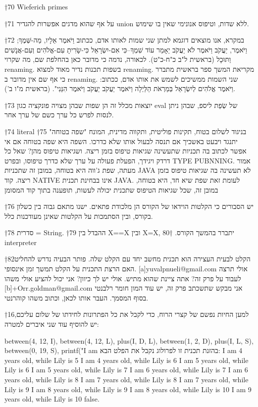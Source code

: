 †{70} Wieferich primes

†{71} על אף שהוא מדגים אפשרות להגדיר union ללא שדות, וטיפוס אנונימי שאין בו שימוש.

†{72} במקרא, אנו מוצאים דוגמא למתן שני שמות לאותו אדם, ככתוב וַיֹּאמֶר אֵלָיו, מַה-שְּׁמֶךָ; וַיֹּאמֶר, יַעֲקֹב וַיֹּאמֶר לֹא יַעֲקֹב יֵאָמֵר עוֹד שִׁמְךָ--כִּי אִם-יִשְׂרָאֵל כִּי-שָׂרִיתָ עִם-אֱלֹהִים וְעִם-אֲנָשִׁים וַתּוּכָל (בראשית ל"ב כ"ח-כ"ט). לכאורה, נדמה כי מדובר כאן בהחלפת שם, מה שקרוי renaming. בשפות תכנות נדיר מאוד למצוא renaming. מקריאת המשך ספר בראשית מתברר כי אף שם אין מדובר ב renaming. שני השמות ממשיכים לשמש את אותו אדם, ככתוב: וַיֹּאמֶר אֱלֹהִים לְיִשְׂרָאֵל בְּמַרְאֹת הַלַּיְלָה וַיֹּאמֶר יַעֲקֹב יַעֲקֹב וַיֹּאמֶר הִנֵּנִי". (בראשית מ"ו ב').

†{73} יוצאות מכלל זה הן שפות שבהן מצויה פונקציה כגון eval של שְׂפַת ליספ, שבהן ניתן לנסות לפרש כל ערך כשם של ערך אחר.

†{74} literal
†{75} בניגוד לשלום בטוח, תקינות פוליטית, ותקווה מדינית, המונח "שפה בטוחה" יתנגד ויבעט באשכיך אם תנסה לבעול אותו שלא כדרכו. השפה היא שפה בטוחה אם אי אפשר לכתוב בה תכניות שתעשינה שגיאות טיפוס בזמן ריצה. ושגיאות טיפוס מהן? שאל כל דרדק ויגידך, הפעלת פעולה על ערך שלא כדרך טיפוסו, ובפרט TYPE PUBNNING. אמור מעתה, שפת ג'ווה היא בטוחה, במובן זה שתכניות JAVA לא תעשינה בה שגיאות טיפוס בזמן ריצה. קוד NATIVE אינו בבחינת תכנית JAVA. לעומת זאת שפת שיא חד, היא בטוחה, במובן זה, שכל שגיאות הטיפוס שתכנית יכולה לעשות, תופענה בתוך קוד המסומן

†{76} יש הסבורים כי הקלטות הוידאו של הקורס הן מלכודת פתאים. ישנו מתאם גבוה בין כשלון בקורס, ובין הסתמכות על הקלטות שאינן מעודכנות כלל.

†{78} סדרית = String.
†{79} ההבדל בין X==X ובין X=X, יתברר בהמשך הקורס.
†{80} interpreter

†{82}הקלט לבעית העצירה הוא תכנית מחשב יחד עם הקלט שלה. פותר הבעיה נדרש להחליט האם הרצת התכנית על הקלט תמשך זמן אינסופי. [a]yuvalpnueli@gmail.com אולי תרצה לעבוד על פרק זה? אתה ציינת שהוא מתיש. אולי יש לך כיוון? אני יכול להציע אולי משהו [b]+Orr.goldman@gmail.com אני מבקש שתשכתב פרק זה, יש עוד המון חומר רלבנטי בסוף המסמך. העבר אותו לכאן, וכתוב משהו קוהרנטי.

†{16}למען החיות נפשם של קצרי הרוח, כדי לקבל את כל הפתרונות לחידתו של שלום עליכם, יש להוסיף עוד שני איברים למטרה:

        between(4, 12, I), between(4, 12, L),
        plus(I, D, L), between(1, 2, D), plus(I, L, S), between(0, 19, S),
        printf("I am %
        בהזנת תכנית זו לפרולוג נקבל את הפלט הבא:
        I am 4 years old, while Lily is 5
        I am 4 years old, while Lily is 6
        I am 5 years old, while Lily is 6
        I am 5 years old, while Lily is 7
        I am 6 years old, while Lily is 7
        I am 6 years old, while Lily is 8
        I am 7 years old, while Lily is 8
        I am 7 years old, while Lily is 9
        I am 8 years old, while Lily is 9
        I am 8 years old, while Lily is 10
        I am 9 years old, while Lily is 10
        false.

